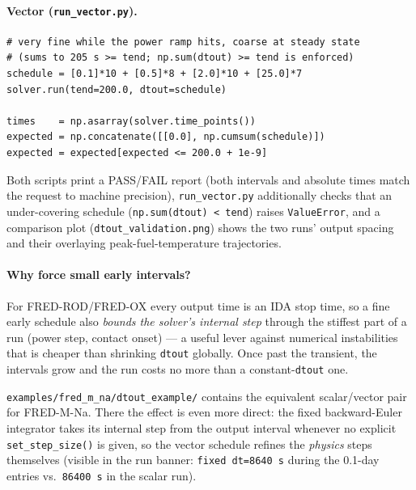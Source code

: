 \documentclass[11pt,a4paper]{article}
\begin{document}
\paragraph{Vector (\texttt{run\_vector.py}).}

\begin{lstlisting}
# very fine while the power ramp hits, coarse at steady state
# (sums to 205 s >= tend; np.sum(dtout) >= tend is enforced)
schedule = [0.1]*10 + [0.5]*8 + [2.0]*10 + [25.0]*7
solver.run(tend=200.0, dtout=schedule)

times    = np.asarray(solver.time_points())
expected = np.concatenate([[0.0], np.cumsum(schedule)])
expected = expected[expected <= 200.0 + 1e-9]
\end{lstlisting}

Both scripts print a PASS/FAIL report (both intervals and absolute times
match the request to machine precision), \texttt{run\_vector.py}
additionally checks that an under-covering schedule
(\texttt{np.sum(dtout) < tend}) raises \texttt{ValueError}, and a comparison
plot (\texttt{dtout\_validation.png}) shows the two runs' output spacing and
their overlaying peak-fuel-temperature trajectories.

\paragraph{Why force small early intervals?}

For FRED-ROD/FRED-OX every output time is an IDA stop time, so a fine early
schedule also \emph{bounds the solver's internal step} through the stiffest
part of a run (power step, contact onset) --- a useful lever against
numerical instabilities that is cheaper than shrinking \texttt{dtout}
globally.  Once past the transient, the intervals grow and the run costs no
more than a constant-\texttt{dtout} one.

\begin{infobox}
  \texttt{examples/fred\_m\_na/dtout\_example/} contains the equivalent
  scalar/vector pair for FRED-M-Na.  There the effect is even more direct:
  the fixed backward-Euler integrator takes its internal step from the
  output interval whenever no explicit \texttt{set\_step\_size()} is given,
  so the vector schedule refines the \emph{physics} steps themselves
  (visible in the run banner: \texttt{fixed dt=8640 s} during the 0.1-day
  entries vs.\ \texttt{86400 s} in the scalar run).
\end{infobox}
\end{document}
